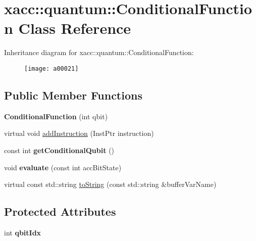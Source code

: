 \hypertarget{a00021}{}\section{xacc\+:\+:quantum\+:\+:Conditional\+Function Class Reference}
\label{a00021}
Inheritance diagram for xacc\+:\+:quantum\+:\+:Conditional\+Function\+:\begin{figure}[H]
\begin{center}
\leavevmode
\texttt{[image: a00021]}
\end{center}
\end{figure}
\subsection*{Public Member Functions}
\begin{DoxyCompactItemize}
\item 
{\bfseries Conditional\+Function} (int qbit)\hypertarget{a00021_aa28610a08ae04d62ccdd8359433100c3}{}\label{a00021_aa28610a08ae04d62ccdd8359433100c3}

\item 
virtual void \hyperlink{a00021_a6aedad20f96390880efdc0a476b3273f}{add\+Instruction} (Inst\+Ptr instruction)
\item 
const int {\bfseries get\+Conditional\+Qubit} ()\hypertarget{a00021_a804317333b6677a041a3071b5108c0df}{}\label{a00021_a804317333b6677a041a3071b5108c0df}

\item 
void {\bfseries evaluate} (const int acc\+Bit\+State)\hypertarget{a00021_a709c236a5beb62d9a3bd5265196fb6c9}{}\label{a00021_a709c236a5beb62d9a3bd5265196fb6c9}

\item 
virtual const std\+::string \hyperlink{a00021_aca7a5f849fece6fc28a904efee9a3370}{to\+String} (const std\+::string \&buffer\+Var\+Name)
\end{DoxyCompactItemize}
\subsection*{Protected Attributes}
\begin{DoxyCompactItemize}
\item 
int {\bfseries qbit\+Idx}\hypertarget{a00021_a0310536801417c0eded28a4dea1efa44}{}\label{a00021_a0310536801417c0eded28a4dea1efa44}

\end{DoxyCompactItemize}
